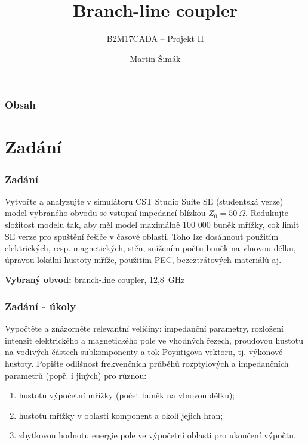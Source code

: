 \documentclass[aspectratio=169, 11pt, hyperref={unicode}]{beamer}
\title{Branch-line coupler}
\subtitle{B2M17CADA -- Projekt II}
\author{Martin Šimák}
\date{\displaydate{date}}
\begin{document}

\begin{frame}
	\titlepage
\end{frame}

\begin{frame}
    \frametitle{Obsah}
    \tableofcontents
\end{frame}

\section{Zadání}
\begin{frame}
\frametitle{Zadání}
Vytvořte a analyzujte v simulátoru CST Studio Suite SE (studentská verze) model vybraného obvodu se vstupní impedancí blízkou $Z_0 = 50\ \Omega$. Redukujte složitost modelu tak, aby měl model maximálně 100 000 buněk mřížky, což limit SE verze pro spuštění řešiče v časové oblasti. Toho lze dosáhnout použitím elektrických, resp. magnetických, stěn, snížením počtu buněk na vlnovou délku, úpravou lokální hustoty mříže, použitím PEC, bezeztrátových materiálů aj.

\textbf{Vybraný obvod:} branch-line coupler, 12,8~GHz
\end{frame}

\begin{frame}
\frametitle{Zadání - úkoly}
Vypočtěte a znázorněte relevantní veličiny: impedanční parametry, rozložení intenzit elektrického a magnetického pole ve vhodných řezech, proudovou hustotu na vodivých částech subkomponenty a tok Poyntigova vektoru, tj. výkonové hustoty. Popište odlišnost frekvenčních průběhů rozptylových a impedančních parametrů (popř. i jiných) pro různou:
\begin{enumerate}
    \item hustotu výpočetní mřížky (počet buněk na vlnovou délku);
    \item hustotu mřížky v oblasti komponent a okolí jejich hran;
    \item zbytkovou hodnotu energie pole ve výpočetní oblasti pro ukončení výpočtu.
\end{enumerate}
\end{frame}
\end{document}
